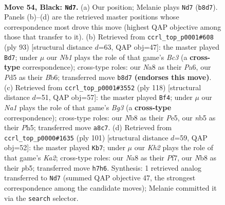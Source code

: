 \documentclass[11pt]{article}
\begin{document}
\clearpage

\begin{figure}[p]\centering
\begin{subfigure}{0.46\textwidth}\centering
\resizebox{\linewidth}{!}{%
\newchessgame
\chessboard[
  setfen={nn6/1p5k/1b6/pN1pB3/6bp/PP2P3/4P1K1/3B4 b - - 5 54},
  showmover=false,
  pgfstyle=straightmove, color=movearrow, markmove={b8-d7}
]}
\caption{}
\end{subfigure}\hfill
\begin{subfigure}{0.46\textwidth}\centering
\resizebox{\linewidth}{!}{%
\newchessgame
\chessboard[
  setfen={6k1/7p/pbb1p3/4p1PB/1B2P3/3r1PK1/2R4P/8 b - - 9 47},
  showmover=false,
  pgfstyle=straightmove, color=movearrow, markmove={c6-d7}
]}
\caption{}
\end{subfigure}
\\[4pt]
\begin{subfigure}{0.46\textwidth}\centering
\resizebox{\linewidth}{!}{%
\newchessgame
\chessboard[
  setfen={8/5p1k/2b1p2p/4P2P/p1Pbp1P1/6B1/P1BK4/8 w - - 8 60},
  showmover=false,
  pgfstyle=straightmove, color=movearrow, markmove={g3-f4}
]}
\caption{}
\end{subfigure}\hfill
\begin{subfigure}{0.46\textwidth}\centering
\resizebox{\linewidth}{!}{%
\newchessgame
\chessboard[
  setfen={8/k4p2/5b2/1P1p1p2/K2P1p2/2B2P1r/1P6/5R2 b - - 6 51},
  showmover=false,
  pgfstyle=straightmove, color=movearrow, markmove={a7-b7}
]}
\caption{}
\end{subfigure}
\caption{\textbf{Move 54, Black: \texttt{Nd7}.} (a) Our position; Melanie plays \texttt{Nd7} (\texttt{b8d7}). Panels (b)--(d) are the retrieved master positions whose correspondence most drove this move (highest QAP objective among those that transfer to it). (b) Retrieved from \texttt{ccrl\_top\_p0001\#608} (ply 93) [structural distance $d$=63, QAP obj=47]: the master played \texttt{Bd7}; under $\mu$ our \emph{Nb1} plays the role of that game's \emph{Bc3} (a \textbf{cross-type} correspondence); cross-type roles: our \emph{N}a8 as their \emph{P}a6, our \emph{P}d5 as their \emph{B}b6; transferred move \texttt{b8d7} \textbf{(endorses this move)}. (c) Retrieved from \texttt{ccrl\_top\_p0001\#3552} (ply 118) [structural distance $d$=51, QAP obj=57]: the master played \texttt{Bf4}; under $\mu$ our \emph{Na1} plays the role of that game's \emph{Bg3} (a \textbf{cross-type} correspondence); cross-type roles: our \emph{N}b8 as their \emph{P}e5, our \emph{n}b5 as their \emph{P}h5; transferred move \texttt{a8c7}. (d) Retrieved from \texttt{ccrl\_top\_p0000\#1635} (ply 101) [structural distance $d$=59, QAP obj=52]: the master played \texttt{Kb7}; under $\mu$ our \emph{Kh2} plays the role of that game's \emph{Ka2}; cross-type roles: our \emph{N}a8 as their \emph{P}f7, our \emph{N}b8 as their \emph{p}b5; transferred move \texttt{h7h6}. Synthesis: 1 retrieved analog transferred to \texttt{Nd7} (summed QAP objective 47, the strongest correspondence among the candidate moves); Melanie committed it via the \texttt{search} selector.}
\label{fig:thought-m107}
\end{figure}
\end{document}
